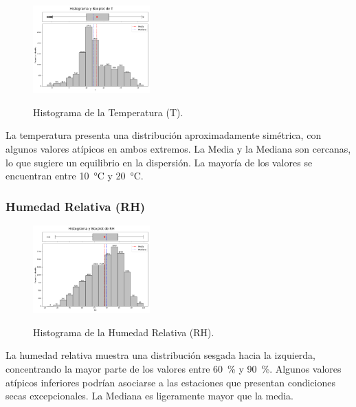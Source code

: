 \begin{figure}[H]
    \caption{Histograma de la Temperatura (T).}
    \centering
    \includegraphics[width=0.4\textwidth]{resultados/global/univariado/T_histograma.png}
    \label{fig:T_histograma}
\end{figure}

La temperatura presenta una distribución aproximadamente simétrica, con algunos valores atípicos en ambos extremos. La Media y la Mediana son cercanas, lo que sugiere un equilibrio en la dispersión. La mayoría de los valores se encuentran entre \SI{10}{\degreeCelsius} y \SI{20}{\degreeCelsius}.

\newpage

\subsubsection*{Humedad Relativa (RH)}

\begin{figure}[H]
    \caption{Histograma de la Humedad Relativa (RH).}
    \centering
    \includegraphics[width=0.4\textwidth]{resultados/global/univariado/RH_histograma.png}
    \label{fig:RH_histograma}
\end{figure}

La humedad relativa muestra una distribución sesgada hacia la izquierda, concentrando la mayor parte de los valores entre \SI{60}{\percent} y \SI{90}{\percent}. Algunos valores atípicos inferiores podrían asociarse a las estaciones que presentan condiciones secas excepcionales. La Mediana es ligeramente mayor que la media.

\vspace{2em}

